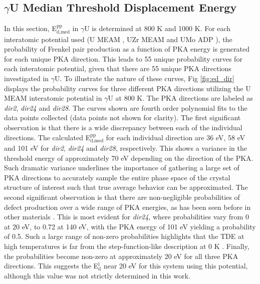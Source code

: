 \documentclass[review]{elsarticle}
\begin{document}
\subsection{$\gamma$U Median Threshold Displacement Energy}
In this section, E$^{\textrm{pp}}_{\textrm{d,med}}$ in $\gamma$U is determined at 800 K and 1000 K. For each interatomic potential used (U MEAM \cite{beeler_meam}, UZr MEAM \cite{moore2015} and UMo ADP \cite{smirnovaADP}), the probability of Frenkel pair production as a function of PKA energy is generated for each unique PKA direction. This leads to 55 unique probability curves for each interatomic potential, given that there are 55 unique PKA directions investigated in $\gamma$U. To illustrate the nature of these curves, Fig \ref{fig:ed_dir} displays the probability curves for three different PKA directions utilizing the U MEAM interatomic potential in $\gamma$U at 800 K. The PKA directions are labeled as \textit{dir2}, \textit{dir24} and \textit{dir28}. The curves shown are fourth order polynomial fits to the data points collected (data points not shown for clarity). The first significant observation is that there is a wide discrepancy between each of the individual directions. The calculated E$^{\textrm{pp}}_{\textrm{d,med}}$ for each individual direction are 36 eV, 58 eV and 101 eV for \textit{dir2}, \textit{dir24} and \textit{dir28}, respectively. This shows a variance in the threshold energy of approximately 70 eV depending on the direction of the PKA. Such dramatic variance underlines the importance of gathering a large set of PKA directions to accurately sample the entire phase space of the crystal structure of interest such that true average behavior can be approximated. The second significant observation is that there are non-negligible probabilities of defect production over a wide range of PKA energies, as has been seen before in other materials \cite{beeler2016, nordlund2006}. This is most evident for \textit{dir24}, where probabilities vary from 0 at 20 eV, to 0.72 at 140 eV, with the PKA energy of 101 eV yielding a probability of 0.5. Such a large range of non-zero probabilities highlights that the TDE at high temperatures is far from the step-function-like description at 0 K \cite{was2007}. Finally, the probabilities become non-zero at approximately 20 eV for all three PKA directions. This suggests the E$^{\textrm{l}}_{\textrm{d}}$ near 20 eV for this system using this potential, although this value was not strictly determined in this work. 
 
\end{document}
